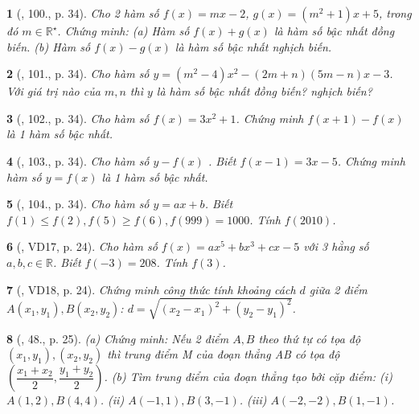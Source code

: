 \documentclass{article}
\newtheorem{baitoan}{}
\begin{document}
\begin{baitoan}[\cite{Tuyen_Toan_9_old}, 100., p. 34]
	Cho 2 hàm số $f(x) = mx - 2$, $g(x) = (m^2 + 1)x + 5$, trong đó $m\in\mathbb{R}^\star$. Chứng minh: (a) Hàm số $f(x) + g(x)$ là hàm số bậc nhất đồng biến. (b) Hàm số $f(x) - g(x)$ là hàm số bậc nhất nghịch biến. 
\end{baitoan}

\begin{baitoan}[\cite{Tuyen_Toan_9_old}, 101., p. 34]
	Cho hàm số $y = (m^2 - 4)x^2 - (2m + n)(5m - n)x - 3$. Với giá trị nào của $m,n$ thì $y$ là hàm số bậc nhất đồng biến? nghịch biến?
\end{baitoan}

\begin{baitoan}[\cite{Tuyen_Toan_9_old}, 102., p. 34]
	Cho hàm số $f(x) = 3x^2 + 1$. Chứng minh $f(x + 1) - f(x)$ là 1 hàm số bậc nhất.
\end{baitoan}

\begin{baitoan}[\cite{Tuyen_Toan_9_old}, 103., p. 34]
	Cho hàm số $y - f(x)$ . Biết $f(x - 1) = 3x - 5$. Chứng minh hàm số $y = f(x)$ là 1 hàm số bậc nhất.
\end{baitoan}

\begin{baitoan}[\cite{Tuyen_Toan_9_old}, 104., p. 34]
	Cho hàm số $y = ax + b$. Biết $f(1)\le f(2),f(5)\ge f(6),f(999) = 1000$. Tính $f(2010)$.
\end{baitoan}

\begin{baitoan}[\cite{Binh_Toan_9_tap_1}, VD17, p. 24]
	Cho hàm số $f(x) = ax^5 + bx^3 + cx - 5$ với 3 hằng số $a,b,c\in\mathbb{R}$. Biết $f(-3) = 208$. Tính $f(3)$.
\end{baitoan}

\begin{baitoan}[\cite{Binh_Toan_9_tap_1}, VD18, p. 24]
	Chứng minh công thức tính khoảng cách $d$ giữa 2 điểm $A(x_1,y_1),B(x_2,y_2)$: $d = \sqrt{(x_2 - x_1)^2 + (y_2 - y_1)^2}$.
\end{baitoan}

\begin{baitoan}[\cite{Binh_Toan_9_tap_1}, 48., p. 25]
	(a) Chứng minh: Nếu 2 điểm $A,B$ theo thứ tự có tọa độ $(x_1,y_1),(x_2,y_2)$ thì trung điểm M của đoạn thẳng AB có tọa độ $\left(\dfrac{x_1 + x_2}{2},\dfrac{y_1 + y_2}{2}\right)$. (b) Tìm trung điểm của đoạn thẳng tạo bởi cặp điểm: (i) $A(1,2),B(4,4)$. (ii) $A(-1,1),B(3,-1)$. (iii) $A(-2,-2),B(1,-1)$.
\end{baitoan}
\end{document}

